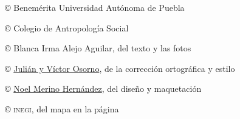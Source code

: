 \documentclass[14pt,letterpaper,twoside]{extbook} %
\begin{document}
\newpage
\pagestyle{empty}
\null\vfill
\begin{scriptsize}
\begin{minipage}{7.5cm}

\hspace{-0.6cm} \noindent \copyright {} Benemérita Universidad Autónoma de Puebla

\hspace{-0.6cm} \noindent \copyright {} Colegio de Antropología Social

\hspace{-0.6cm} \noindent \copyright {} Blanca Irma Alejo Aguilar, del texto y las fotos

\hspace{-0.6cm} \noindent \copyright {} \href{julian2che@gmail.com}{Julián y Víctor Osorno}, de la corrección ortográfica y estilo

\hspace{-0.6cm} \noindent \copyright {} \href{noel_merino@yahoo.com.mx}{Noel Merino Hernández}, del diseño y maquetación

\hspace{-0.6cm} \noindent \copyright {} \textsc{inegi}, del mapa en la página \pageref{chiautempan} \\
\end{minipage}
\end{scriptsize}
\\
\end{document}

